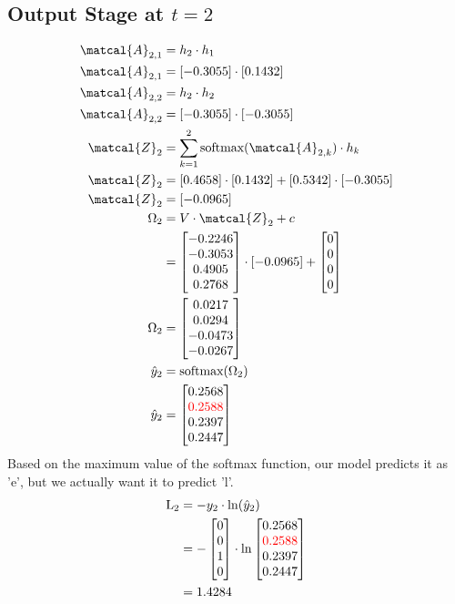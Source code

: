 \documentclass{article}
\begin{document}
\subsection*{Output Stage at $t=2$}
\begin{align*}
\matcal{A}_{2,1} &= h_2 \cdot h_1 \\
\matcal{A}_{2,1} &= [-0.3055] \cdot [0.1432] \\
\matcal{A}_{2,2} &= h_2 \cdot h_2 \\
\matcal{A}_{2,2} &= [-0.3055] \cdot [-0.3055] \\
\matcal{Z}_2 &= \sum_{k=1}^2 \text{softmax}(\matcal{A}_{2,k}) \cdot h_k \\
\matcal{Z}_2 &= [0.4658] \cdot [0.1432] + [0.5342] \cdot [-0.3055]\\
\matcal{Z}_2 &= [-0.0965] \\
\Omega_2 &= V \cdot \matcal{Z}_2 + c \\
 &= \begin{bmatrix} -0.2246 \\ -0.3053 \\ 0.4905 \\ 0.2768 \end{bmatrix} \cdot [-0.0965] + \begin{bmatrix} 0 \\ 0 \\ 0 \\ 0\end{bmatrix}\\
\Omega_2 &= \begin{bmatrix} 0.0217 \\ 0.0294 \\ -0.0473 \\ -0.0267 \end{bmatrix} \\
\hat{y}_2 &= \text{softmax}(\Omega_2) \\
\hat{y}_2 &= \begin{bmatrix} 0.2568 \\ \textcolor{red}{0.2588} \\ 0.2397 \\ 0.2447 \end{bmatrix} \\
\end{align*}
Based on the maximum value of the softmax function, our model predicts it as 'e', but we actually want it to predict 'l'.
\begin{align*}
    \text{L}_{2} & = -y_2 \cdot \ln(\hat{y}_2) \\
    &=-\begin{bmatrix} 0 \\ 0 \\ 1 \\ 0 \end{bmatrix} \cdot \ln{\begin{bmatrix} 0.2568 \\ \textcolor{red}{0.2588} \\ 0.2397 \\ 0.2447 \end{bmatrix}}\\
    &=1.4284
\end{align*}
\end{document}
